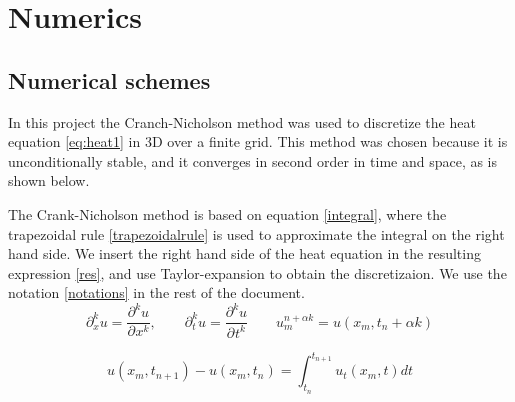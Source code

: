 \chapter{Numerics}

\section{Numerical schemes}

In this project the Cranch-Nicholson method was used to discretize the heat
equation \cref{eq:heat1} in 3D over a finite grid. This method was chosen because
it is unconditionally stable, and it converges in second order in time and space, as is shown below.

The Crank-Nicholson method is based on equation \cref{integral}, where the trapezoidal rule \cref{trapezoidalrule} is used to approximate the integral on the right hand side. We insert the right hand side of the heat equation in the resulting expression \cref{res}, and use Taylor-expansion to obtain the discretizaion. We use the notation \cref{notations} in the rest of the document.
\begin{equation}
\partial_{x}^{k}u=\frac{\partial^{k}u}{\partial^{}x^{k}},\quad \quad \partial_{t}^{k}u=\frac{\partial^{k}u}{\partial^{}t^{k}} \quad \quad u_{m}^{n+\alpha k } = u(x_{m},t_{n}+\alpha k)
\label{notations}
\end{equation}

\begin{equation}
u(x_m,t_{n+1}) - u(x_m,t_n) = \int_{t_n} ^{t_{n+1}} u_t(x_m,t) dt
\label{integral}
\end{equation}

